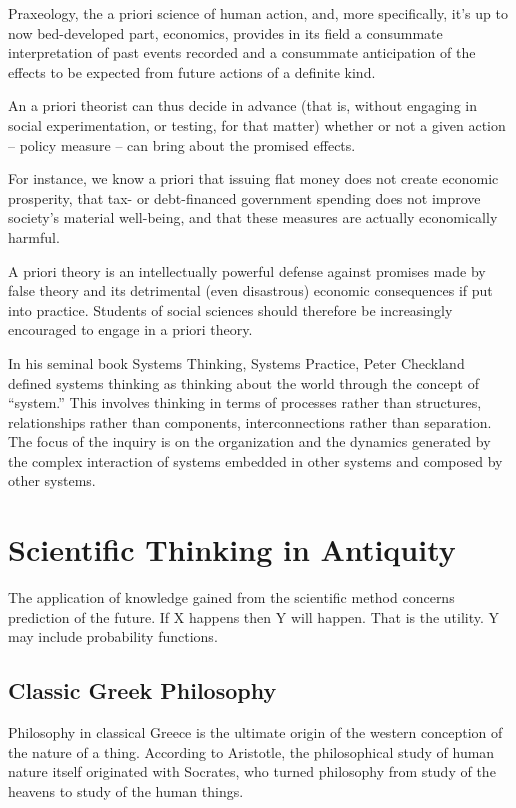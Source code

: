 Praxeology, the a priori science of human action, and, more specifically, it’s up to now bed-developed part, economics, provides in its field a consummate interpretation of past events recorded and a consummate anticipation of the effects to be expected from future actions of a definite kind.

An a priori theorist can thus decide in advance (that is, without engaging in social experimentation, or testing, for that matter) whether or not a given action – policy measure – can bring about the promised effects.

For instance, we know a priori that issuing flat money does not create economic prosperity, that tax- or debt-financed government spending does not improve society’s material well-being, and that these measures are actually economically harmful.

A priori theory is an intellectually powerful defense against promises made by false theory and its detrimental (even disastrous) economic consequences if put into practice. Students of social sciences should therefore be increasingly encouraged to engage in a priori theory.

In his seminal book Systems Thinking, Systems Practice, Peter Checkland defined systems thinking as thinking about the world through the concept of “system.”  This involves thinking in terms of processes rather than structures, relationships rather than components, interconnections rather than separation. The focus of the inquiry is on the organization and the dynamics generated by the complex interaction of systems embedded in other systems and composed by other systems.


\section{Scientific Thinking in Antiquity}

The application of knowledge gained from the scientific method concerns prediction of the future. If X happens then Y will happen. That is the utility. Y may include probability functions.

\subsection{Classic Greek Philosophy}

Philosophy in classical Greece is the ultimate origin of the western conception of the nature of a thing. According to Aristotle, the philosophical study of human nature itself originated with Socrates, who turned philosophy from study of the heavens to study of the human things.

